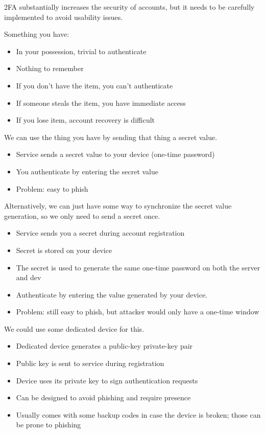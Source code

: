 \documentclass[12pt]{report}
\begin{document}
2FA substantially increases the security of accounts, but it needs to be carefully implemented to avoid usability issues.

Something you have:
\begin{itemize}[noitemsep]
    \item In your possession, trivial to authenticate
    \item Nothing to remember
    \item If you don't have the item, you can't authenticate
    \item If someone steals the item, you have immediate access
    \item If you lose item, account recovery is difficult
\end{itemize}

We can use the thing you have by sending that thing a secret value.
\begin{itemize}[noitemsep]
    \item Service sends a secret value to your device (one-time password)
    \item You authenticate by entering the secret value
    \item Problem: easy to phish
\end{itemize}

Alternatively, we can just have some way to synchronize the secret value generation, so we only need to send a secret once.
\begin{itemize}[noitemsep]
    \item Service sends you a secret during account registration
    \item Secret is stored on your device
    \item The secret is used to generate the same one-time password on both the server and dev
    \item Authenticate by entering the value generated by your device.
    \item Problem: still easy to phish, but attacker would only have a one-time window
\end{itemize}

We could use some dedicated device for this.
\begin{itemize}[noitemsep]
    \item Dedicated device generates a public-key private-key pair
    \item Public key is sent to service during registration
    \item Device uses its private key to sign authentication requests
    \item Can be designed to avoid phishing and require presence
    \item Usually comes with some backup codes in case the device is broken; those can be prone to phishing
\end{itemize}
\end{document}
